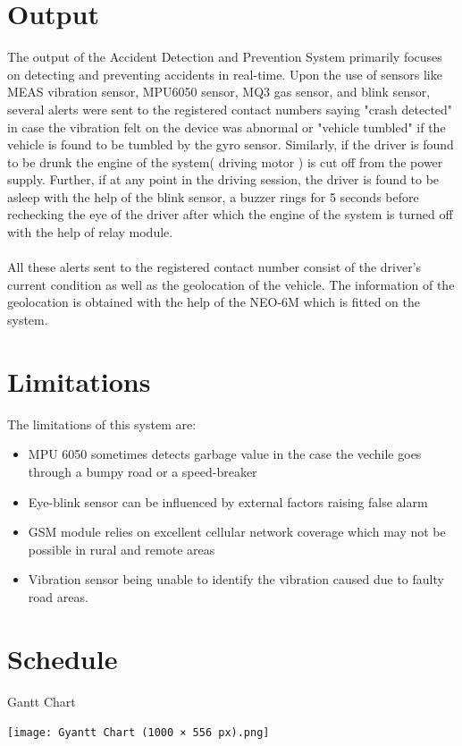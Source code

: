\documentclass[12pt,a4paper]{report}
\begin{document}
	\section{Output}
    \begin{justify}
The output of the Accident Detection and Prevention System primarily focuses on detecting and preventing accidents in real-time. Upon the use of sensors like MEAS vibration sensor, MPU6050 sensor, MQ3 gas sensor, and blink sensor, several alerts were sent to the registered contact numbers saying "crash detected" in case the vibration felt on the device was abnormal or "vehicle tumbled" if the vehicle is found to be tumbled by the gyro sensor. Similarly, if the driver is found to be drunk the engine of the system( driving motor ) is cut off from the power supply. Further, if at any point in the driving session, the driver is found to be asleep with the help of the blink sensor, a buzzer rings for 5 seconds before rechecking the eye of the driver after which the engine of the system is turned off with the help of relay module.\\\\
All these alerts sent to the registered contact number consist of the driver's current condition as well as the geolocation of the vehicle. The information of the geolocation is obtained with the help of the NEO-6M which is fitted on the system.
    \end{justify}
 
\section{Limitations}
The limitations of this system are:
\begin{itemize}
    \item MPU 6050 sometimes detects garbage value in the case the vechile goes through a bumpy road or a speed-breaker
    \item Eye-blink sensor can be influenced by external factors raising false alarm 
    \item GSM module relies on excellent cellular network coverage which may not be possible in rural and remote areas
    \item Vibration sensor being unable to identify the vibration caused due to faulty road areas.
\end{itemize}
\pagebreak
 \section{Schedule}
 \begin{table}[ht]
     \centering
     \caption{Gantt Chart}
     \texttt{[image: Gyantt Chart (1000 × 556 px).png]}
     \label{tab:my_label}
 \end{table}
\end{document}
